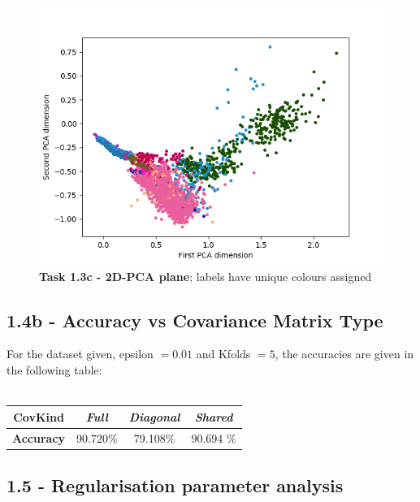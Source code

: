 \documentclass[12pt]{article}
\begin{document}
\begin{figure}[!htb]
\centering
\includegraphics[scale=0.8]{task1_3c_scatter_classes.png}
\caption{\textbf{Task 1.3c - 2D-PCA plane}; labels have unique colours assigned}
\end{figure}

\newpage

\subsection*{1.4b - Accuracy vs Covariance Matrix Type}

For the dataset given, epsilon $ = 0.01$ and Kfolds $ = 5$, the accuracies are given in the following table:\\\\
\begin{tabular}{|c|c|c|c|}
\hline 
\textbf{CovKind} & \emph{Full} & \emph{Diagonal} & \emph{Shared} \\ 
\hline 
\textbf{Accuracy} & 90.720\% & 79.108\% & 90.694 \% \\ 
\hline 
\end{tabular} 

\subsection*{1.5 - Regularisation parameter analysis}
\end{document}
